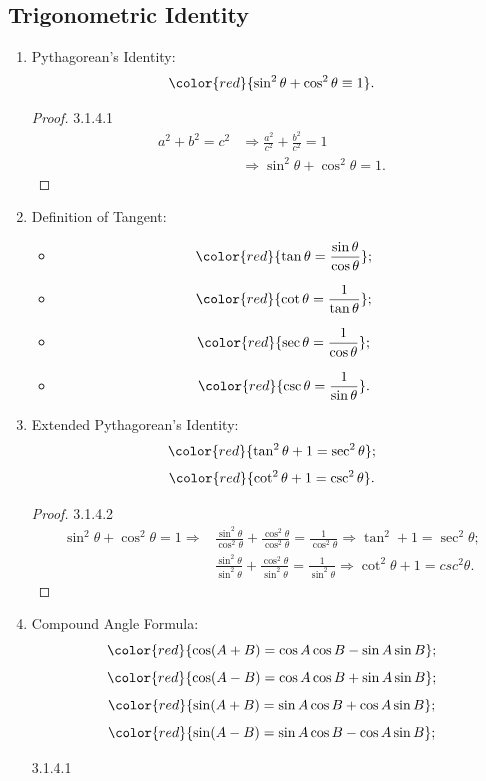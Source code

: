 \documentclass[12pt, a4paper]{article}
\begin{document}
\subsection{Trigonometric Identity}
\begin{enumerate}
  \item Pythagorean's Identity: 
  $${\color{red}{\sin^2\theta+\cos^2\theta\equiv1}}.$$
  \begin{proof}{3.1.4.1}{}
    $$\begin{aligned}
      a^2+b^2=c^2&\Rightarrow\frac{a^2}{c^2}+\frac{b^2}{c^2}=1\\
      &\Rightarrow\sin^2\theta+\cos^2\theta=1.
    \end{aligned}$$
  \end{proof}
  \item Definition of Tangent: 
  \begin{itemize}
    \item $${\color{red}{\tan\theta=\frac{\sin\theta}{\cos\theta}}};$$
    \item $${\color{red}{\cot\theta=\frac{1}{\tan\theta}}};$$
    \item $${\color{red}{\sec\theta=\frac{1}{\cos\theta}}};$$
    \item $${\color{red}{\csc\theta=\frac{1}{\sin\theta}}}.$$
  \end{itemize}
  \item Extended Pythagorean's Identity: 
  $${\color{red}{\tan^2\theta+1=\sec^2\theta}};$$
  $${\color{red}{\cot^2\theta+1=\csc^2\theta}}.$$
  \begin{proof}{3.1.4.2}{}
    $$\begin{aligned}
      \sin^2\theta+\cos^2\theta=1\Rightarrow&\frac{\sin^2\theta}{\cos^2\theta}+\frac{\cos^2\theta}{\cos^2\theta}=\frac{1}{\cos^2\theta}\Rightarrow\tan^2+1=\sec^2\theta;\\
      &\frac{\sin^2\theta}{\sin^2\theta}+\frac{\cos^2\theta}{\sin^2\theta}=\frac{1}{\sin^2\theta}\Rightarrow\cot^2\theta+1=csc^2\theta.
    \end{aligned}$$
    {\color{green}{N.B.: a reflex angle is an angle bigger than $180^\circ$, smaller than $360^\circ$.}}
  \end{proof}
  \item Compound Angle Formula: 
  $${\color{red}{\cos(A+B)=\cos{A}\cos{B}-\sin{A}\sin{B}}};$$
  $${\color{red}{\cos(A-B)=\cos{A}\cos{B}+\sin{A}\sin{B}}};$$
  $${\color{red}{\sin(A+B)=\sin{A}\cos{B}+\cos{A}\sin{B}}};$$
  $${\color{red}{\sin(A-B)=\sin{A}\cos{B}-\cos{A}\sin{B}}};$$
  \begin{example}{3.1.4.1}{}

\end{example}
\end{enumerate}
\end{document}
